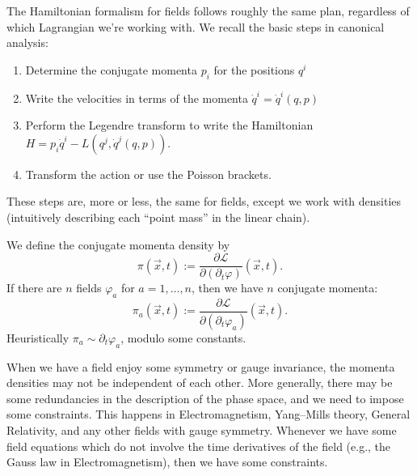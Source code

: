 \M
The Hamiltonian formalism for fields follows roughly the same plan,
regardless of which Lagrangian we're working with. We recall the basic
steps in canonical analysis:
\begin{enumerate}
\item Determine the conjugate momenta $p_{i}$ for the positions $q^{i}$
\item Write the velocities in terms of the momenta $\dot{q}^{i}=\dot{q}^{i}(q,p)$
\item Perform the Legendre transform to write the Hamiltonian $H=p_{i}\dot{q}^{i}-L(q^{j},\dot{q}^{j}(q,p))$.
\item Transform the action or use the Poisson brackets.
\end{enumerate}
These steps are, more or less, the same for fields, except we work with
densities (intuitively describing each ``point mass'' in the linear chain). 

We define the conjugate momenta density by
\begin{equation}
\pi(\vec{x},t) := \frac{\partial\mathcal{L}}{\partial(\partial_{t}\varphi)}(\vec{x},t).
\end{equation}
If there are $n$ fields $\varphi_{a}$ for $a=1,\dots,n$, then we have
$n$ conjugate momenta:
\begin{equation}
\pi_{a}(\vec{x},t) := \frac{\partial\mathcal{L}}{\partial(\partial_{t}\varphi_{a})}(\vec{x},t).
\end{equation}
Heuristically $\pi_{a}\sim\partial_{t}\varphi_{a}$, modulo some constants.

\begin{ddanger}
When we have a field enjoy some symmetry or gauge invariance, the
momenta densities may not be independent of each other. More generally,
there may be some redundancies in the description of the phase space,
and we need to impose some constraints. This happens in
Electromagnetism, Yang--Mills theory, General Relativity, and any other
fields with gauge symmetry. Whenever we have some field equations which
do not involve the time derivatives of the field (e.g., the Gauss law in
Electromagnetism), then we have some constraints.
\end{ddanger}

